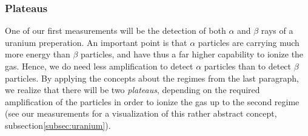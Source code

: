 \subsubsection{Plateaus}
\label{subsec:plateaus}
One of our first measurements will be the detection of both $\alpha$ and $\beta$ rays of a uranium preperation.
An important point is that $\alpha$ particles are carrying much more energy than $\beta$ particles, and
have thus a far higher capability to ionize the gas. Hence, we do need less amplification to detect $\alpha$
particles than to detect $\beta$ particles. By applying the concepts about the regimes from the last 
paragraph, we realize that there will be two \textit{plateaus}, depending on the required amplification of
the particles in order to ionize the gas up to the second regime (see our measurements for a visualization
of this rather abstract concept, subsection\ref{subsec:uranium}).
